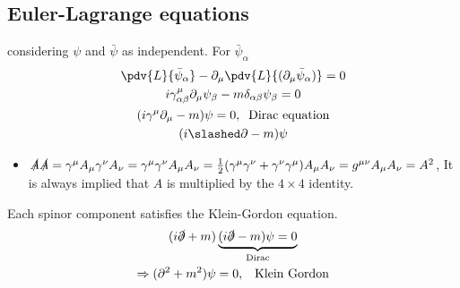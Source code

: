 \documentclass[]{scrartcl}
\begin{document}
\subsection{Euler-Lagrange equations}
considering $\psi$ and $\bar\psi$ as independent. For $\bar\psi_\alpha$
\begin{gather}
	\pdv{L}{\bar\psi_\alpha} - \partial_\mu \pdv{L}{(\partial_\mu\bar\psi_\alpha)} = 0\\
	i\gamma^\mu_{\alpha\beta}\partial_\mu\psi_\beta - m\delta_{\alpha\beta}\psi_\beta = 0\\
	(i\gamma^\mu\partial_\mu - m)\psi = 0,\;\;\text{Dirac equation}\\
	(i\slashed\partial - m)\psi
\end{gather}
\begin{itemize}
	\item $\slashed A\slashed A = \gamma^\mu A_\mu \gamma^\nu A_\nu = \gamma^\mu\gamma^\nu A_\mu A_\nu = \frac{1}{2}(\gamma^\mu\gamma^\nu + \gamma^\nu\gamma^\mu)A_\mu A_\nu = g^{\mu\nu}A_\mu A_\nu= A^2$, It is always implied that $A$ is multiplied by the $4\times4$ identity.
\end{itemize}
Each spinor component satisfies the Klein-Gordon equation.
\begin{gather}
	(i\slashed\partial + m)\underbrace{(i\slashed\partial - m)\psi = 0}_{\text{Dirac}}\\
	\Rightarrow (\partial^2 + m^2)\psi = 0,\;\;\;\text{Klein Gordon}
\end{gather}
\end{document}
